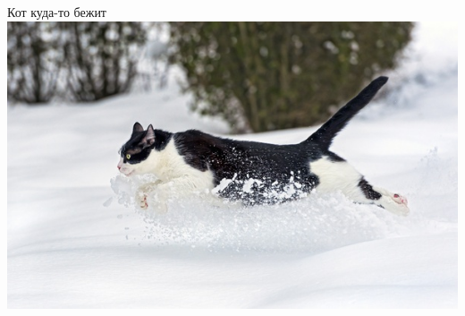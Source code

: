\documentclass{article}
\begin{document}
Кот куда-то бежит \\
\includegraphics[trim={1cm, 1cm, 2cm, 0cm},clip,scale=0.5]{cat.jpg}
\end{document}
